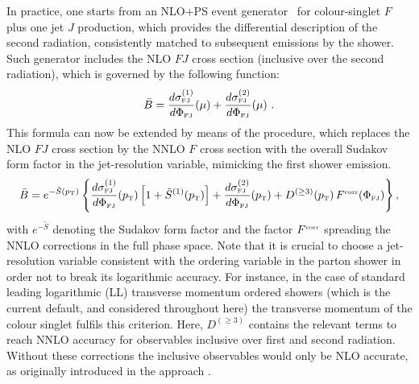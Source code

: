 \documentclass[11pt,a4paper]{article}
\begin{document}
In practice, one starts from an NLO+PS \POWHEG{} event
generator~\cite{alioli:2010xd} for colour-singlet $F$ plus one jet $J$
production, which provides the differential description of the 
second radiation, consistently matched to subsequent emissions
by the shower. Such generator includes the NLO $FJ$ cross section 
(inclusive over the second radiation), which is governed by the following
function:
\begin{equation}
  \bar{B} = \frac{d\sigma_{\scriptscriptstyle\rm
      FJ}^{(1)}}{d\Phi_{\scriptscriptstyle\rm FJ}}\!\left(\mu\right) +
  \frac{d\sigma_{\scriptscriptstyle\rm
      FJ}^{(2)}}{d\Phi_{\scriptscriptstyle\rm FJ}}\!\left(\mu\right)\,.
\end{equation}
This formula can now be extended by means of the \minnlo{} procedure,
which replaces the NLO $FJ$ cross section by the NNLO $F$ cross section
with the overall Sudakov form factor in the jet-resolution variable, mimicking
the first shower emission.
\begin{equation}
  \label{MiNNLOPS_cross_section}
  \bar{B} = e^{-\tilde{S}\left(p_{\scriptscriptstyle\rm T}\right)}
  \left\{\frac{d\sigma_{\scriptscriptstyle\rm
      FJ}^{(1)}}{d\Phi_{\scriptscriptstyle\rm
      FJ}}\!\left(p_{\scriptscriptstyle\rm T}\right) \left[1 +
    \tilde{S}^{(1)}\!\left(p_{\scriptscriptstyle\rm T}\right)\right] +
  \frac{d\sigma_{\scriptscriptstyle\rm
      FJ}^{(2)}}{d\Phi_{\scriptscriptstyle\rm
      FJ}}\!\left(p_{\scriptscriptstyle\rm T}\right) + D^{(\geq
    3)}\!\left(p_{\scriptscriptstyle\rm T}\right)
  F^{\scriptscriptstyle\rm corr}\!\left(\Phi_{\scriptscriptstyle\rm
    FJ}\right)\right\},
\end{equation}
with $e^{-\tilde{S}}$ denoting the Sudakov form factor and 
the factor $F^{\scriptscriptstyle\rm corr}$ spreading the NNLO corrections
in the full phase space.
Note that it is crucial to choose a jet-resolution variable 
consistent with the ordering variable in the parton shower in order not to break
its logarithmic accuracy. For instance, in the case of standard leading logarithmic (LL) 
transverse momentum ordered showers (which is the current default, and 
considered throughout here) the transverse 
momentum of the colour singlet fulfils this criterion.
Here, $D^{(\geq 3)}$ contains the relevant terms to reach 
NNLO accuracy for observables inclusive over first and second radiation.
Without these corrections the inclusive observables would only be NLO accurate,
as originally introduced in the \minlo{} approach \cite{hamilton:2012rf,hamilton:2012np}.
\end{document}
